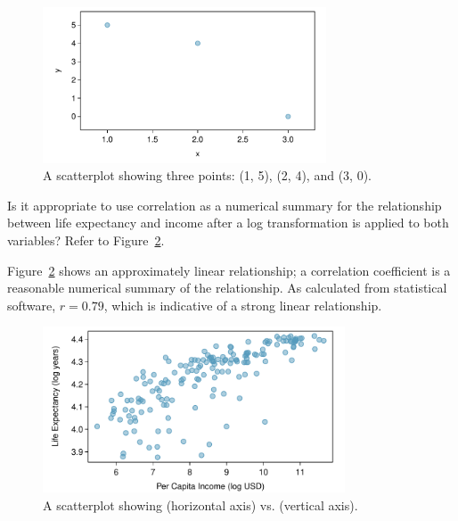 \begin{figure}[h]
	\centering
	\includegraphics[width=0.75\textwidth]
	{ch_01a_intro_to_data_oi_biostat/figures/corCalcSimple/corCalcSimple.pdf}
	\caption{A scatterplot showing three points: (1, 5), (2, 4), and (3, 0).} 
	\label{fig:corCalcSimple}
\end{figure}


\begin{examplewrap}
\begin{nexample}{Is it appropriate to use correlation as a numerical summary for the relationship between life expectancy and income after a log transformation is applied to both variables? Refer to Figure~\ref{incomeLifeExpectancyLog}.}
	
Figure~\ref{incomeLifeExpectancyLog} shows an approximately linear relationship; a correlation coefficient is a reasonable numerical summary of the relationship. As calculated from statistical software, $r = 0.79$, which is indicative of a strong linear relationship.
\end{nexample}
\end{examplewrap}

\begin{figure}[h]
	\centering
	\includegraphics[width=0.8\textwidth]
	{ch_01a_intro_to_data_oi_biostat/figures/wdiIncomeLifeExpectancyLog/wdiIncomeLifeExpectancyLog.pdf}
	\caption{A scatterplot showing  (horizontal axis) vs.   (vertical axis).} 
	\label{incomeLifeExpectancyLog}
\end{figure}

